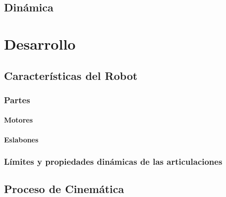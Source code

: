 \documentclass[a4paper,12pt, oneside]{book}
\begin{document}
		\section{Dinámica} \label{sec:dinamica}
		
	
	\chapter{Desarrollo} \label{chap:desarrollo}
	
	
		\section{Características del Robot} \label{sec:caracteristicas_del_robot}
		
		
		
		\subsection{Partes} \label{subsec:partes}
		
		
		\subsubsection{Motores} \label{subsubsec:motores}
		
		
		\subsubsection{Eslabones} \label{subsubsec:eslabones}
		
		
		\subsection{Límites y propiedades dinámicas de las articulaciones} \label{subsec:limites_propiedades}
		
		
		\section{Proceso de Cinemática} \label{sec:proceso_cinematica}
		
		
\end{document}
